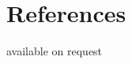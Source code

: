\documentclass[11pt,a4paper,roman]{moderncv}       %
\begin{document}





\section{References}

\vspace{6pt}
 
available on request

\nocite{*}



\end{document}
